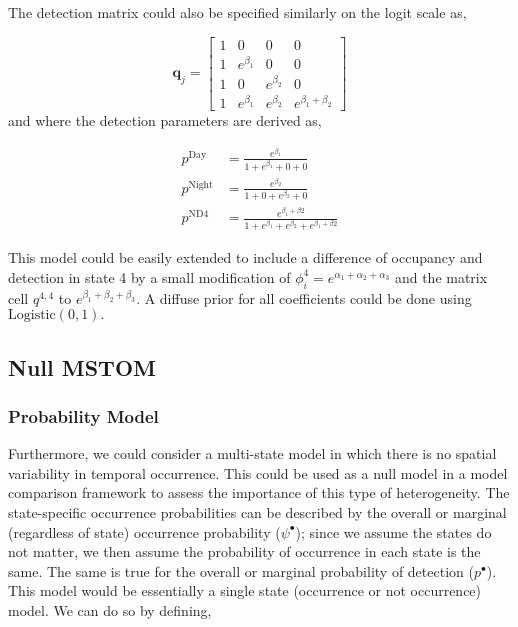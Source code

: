 \documentclass[12pt]{article}
\begin{document}
The detection matrix could also be specified similarly on the logit scale as,

\begin{equation}
\boldsymbol{q}_{j} = \begin{bmatrix} 1 & 0 & 0 & 0 \\ 
									1 & e^{\beta_{1}} & 0 & 0 \\ 
									1 & 0 & e^{\beta_{2}} & 0\\
  								      1 & e^{\beta_{1}} & e^{\beta_{2}} & e^{\beta_{1}+\beta_{2}}  
  								      \end{bmatrix}
\end{equation}
and where the detection parameters are derived as,
\begin{center}
\begin{align*}
p^{\text{Day}} &= \frac{e^{\beta_{1}}}{1+e^{\beta_{1}}+0+0}\\
p^{\text{Night}} &= \frac{e^{\beta_{2}}}{1+0+e^{\beta_{2}}+0}\\
 p^{\text{ND4}} &= \frac{e^{\beta_{1}+\beta{2}}}{1+e^{\beta_{1}}+e^{\beta_{2}}+e^{\beta_{1}+\beta{2}}}
\end{align*}
\end{center}

This model could be easily extended to include a difference of occupancy and detection in state 4 by a small modification of $\phi^4_{i} = e^{\alpha_{1}+\alpha_{2}+\alpha_{3}}$ and the matrix cell $q^{4,4}$ to $e^{\beta_{1}+\beta_{2}+\beta_{3}} $. A diffuse prior for all coefficients could be done using $\text{Logistic}(0,1).$ \\

\subsection{Null MSTOM}
\subsubsection{Probability Model}
Furthermore, we could consider a multi-state model in which there is no spatial variability in temporal occurrence. This could be used as a null model in a model comparison framework to assess the importance of this type of heterogeneity. The state-specific occurrence probabilities can be described by the overall or marginal (regardless of state) occurrence probability ($\psi^{\bullet}$); since we assume the states do not matter, we then assume the probability of occurrence in each state is the same. The same is true for the overall or marginal probability of detection ($p^{\bullet}$). This model would be essentially a single state (occurrence or not occurrence) model. We can do so by defining, 
\end{document}
